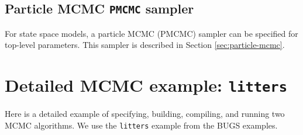\documentclass[12pt,oneside]{book}\usepackage[]{graphicx}\usepackage[]{color}
\def\cd#1{\texttt{#1}}
\begin{document}


\subsection{Particle MCMC \cd{PMCMC} sampler}
For state space models, a particle MCMC (PMCMC) sampler can be specified for top-level parameters.  This sampler is described in Section \ref{sec:particle-mcmc}.

\section{Detailed MCMC example: \cd{litters}}
\label{sec:mcmc-example-litters}

Here is a detailed example of specifying, building, compiling, and running two MCMC algorithms.  We use the \cd{litters} example from the BUGS examples.
\end{document}
